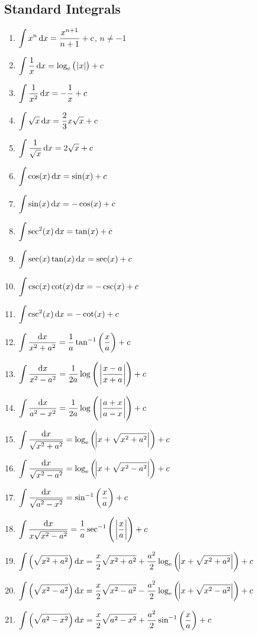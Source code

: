 \documentclass[14]{article}
\theoremstyle{definition}
\theoremstyle{case}
\begin{document}
\subsection{Standard Integrals}
\begin{enumerate}
\item $\displaystyle\int x^n \dif x = \dfrac{x^{n+1}}{n+1} + c$, $n \neq -1$
\item $\displaystyle\int \dfrac1x \dif x = \log_{\rm e}\left(\;\abs{x}\right) + c$
\item $\displaystyle\int \dfrac1{x^2} \dif x = -\dfrac1x + c$
\item $\displaystyle\int\sqrt{x} \dif x = \dfrac23 x\sqrt{x} + c$
\item $\displaystyle\int \dfrac1{\sqrt{x}} \dif x =  2\sqrt{x} + c$\pagebreak
\item $\displaystyle\int \cos(x) \dif x = \sin(x) + c$
\item $\displaystyle\int \sin(x) \dif x = -\cos(x) + c$
\item $\displaystyle\int \sec^2(x) \dif x = \tan(x) + c$
\item $\displaystyle\int \sec(x) \tan(x) \dif x = \sec(x) + c$
\item $\displaystyle\int \csc(x) \cot(x) \dif x = -\csc(x) + c$
\item $\displaystyle\int \csc^2(x) \dif x = -\cot(x) + c$
\item $\displaystyle\int \dfrac{\dif x}{x^2 + a^2} = \dfrac1a \tan^{-1}\left(\dfrac{x}{a}\right) + c$
\item $\displaystyle\int \dfrac{\dif x}{x^2 - a^2} = \dfrac1{2a} \log\left(\;\abs{\dfrac{x-a}{x+a}} \right) + c$
\item $\displaystyle\int \dfrac{\dif x}{a^2 -x^2} = \dfrac1{2a} \log\left(\;\abs{\dfrac{a+x}{a-x}} \right) + c$
\item $\displaystyle \int \dfrac{\dif x}{\sqrt{x^2 + a^2}} = \log_{\rm e}\left( \abs{x + \sqrt{x^2 + a^2}}  \right) + c$
\item $\displaystyle \int \dfrac{\dif x}{\sqrt{x^2 - a^2}} = \log_{\rm e} \left( \abs{x + \sqrt{x^2 - a^2}} \right) + c$
\item $\displaystyle \int \dfrac{\dif x}{\sqrt{a^2 - x^2}} = \sin^{-1}\left( \dfrac{x}{a} \right) + c$
\item $\displaystyle \int \dfrac{\dif x}{x \sqrt{x^2 - a^2}} =  \dfrac1{a} \sec^{-1}\left(\;\abs{ \dfrac{x}{a}} \right) + c$
\item $\displaystyle \int \left( \sqrt{x^2 + a^2} 
\right) \dif x = \dfrac{x}{2}\sqrt{x^2 + a^2} + \dfrac{a^2}{2}\log_{\rm e} \left( \abs{x + \sqrt{x^2 + a^2}} \right) + c$
\item $\displaystyle \int \left( \sqrt{x^2 - a^2} 
\right) \dif x = \dfrac{x}{2}\sqrt{x^2 - a^2} - \dfrac{a^2}{2}\log_{\rm e} \left( \abs{x + \sqrt{x^2 - a^2}} \right) + c$
\item $\displaystyle \int \left( \sqrt{a^2 - x^2} \right) \dif x = \dfrac{x}{2}\sqrt{a^2 - x^2} + \dfrac{a^2}{2}\sin^{-1}\left( \dfrac{x}{a} \right) + c$
\end{enumerate}
\pagebreak
\end{document}
